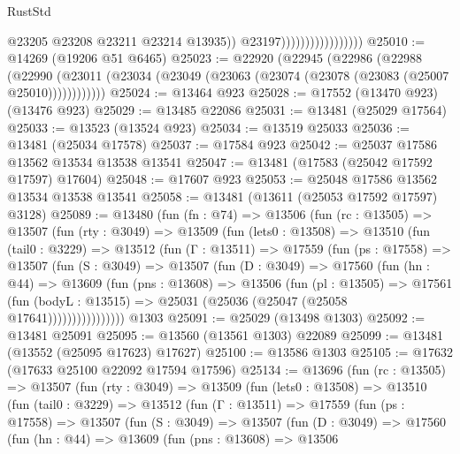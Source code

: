 \begin{lexlean}{RustStd}
\begin{coremodule}
                                          @23205
                                          @23208
                                          @23211
                                          @23214
                                          @13935))
                                      @23197)))))))))))))))))
@25010 := @14269 (@19206 @51 @6465)
@25023 := @22920
    (@22945
      (@22986
        (@22988
          (@22990 (@23011 (@23034 (@23049 (@23063 (@23074 (@23078 (@23083 (@25007 @25010))))))))))))
@25024 := @13464 @923
@25028 := @17552 (@13470 @923) (@13476 @923)
@25029 := @13485 @22086
@25031 := @13481 (@25029 @17564)
@25033 := @13523 (@13524 @923)
@25034 := @13519 @25033
@25036 := @13481 (@25034 @17578)
@25037 := @17584 @923
@25042 := @25037 @17586 @13562 @13534 @13538 @13541
@25047 := @13481 (@17583 (@25042 @17592 @17597) @17604)
@25048 := @17607 @923
@25053 := @25048 @17586 @13562 @13534 @13538 @13541
@25058 := @13481 (@13611 (@25053 @17592 @17597) @3128)
@25089 := @13480
    (fun (fn : @74) =>
    @13506
      (fun (rc : @13505) =>
      @13507
        (fun (rty : @3049) =>
        @13509
          (fun (lets0 : @13508) =>
          @13510
            (fun (tail0 : @3229) =>
            @13512
              (fun (Γ : @13511) =>
              @17559
                (fun (ps : @17558) =>
                @13507
                  (fun (S : @3049) =>
                  @13507
                    (fun (D : @3049) =>
                    @17560
                      (fun (hn : @44) =>
                      @13609
                        (fun (pns : @13608) =>
                        @13506
                          (fun (pl : @13505) =>
                          @17561
                            (fun (bodyL : @13515) =>
                            @25031 (@25036 (@25047 (@25058 @17641))))))))))))))))
    @1303
@25091 := @25029 (@13498 @1303)
@25092 := @13481 @25091
@25095 := @13560 (@13561 @1303) @22089
@25099 := @13481 (@13552 (@25095 @17623) @17627)
@25100 := @13586 @1303
@25105 := @17632 (@17633 @25100 @22092 @17594 @17596)
@25134 := @13696
    (fun (rc : @13505) =>
    @13507
      (fun (rty : @3049) =>
      @13509
        (fun (lets0 : @13508) =>
        @13510
          (fun (tail0 : @3229) =>
          @13512
            (fun (Γ : @13511) =>
            @17559
              (fun (ps : @17558) =>
              @13507
                (fun (S : @3049) =>
                @13507
                  (fun (D : @3049) =>
                  @17560
                    (fun (hn : @44) =>
                    @13609
                      (fun (pns : @13608) =>
                      @13506

\end{coremodule}
\end{lexlean}
